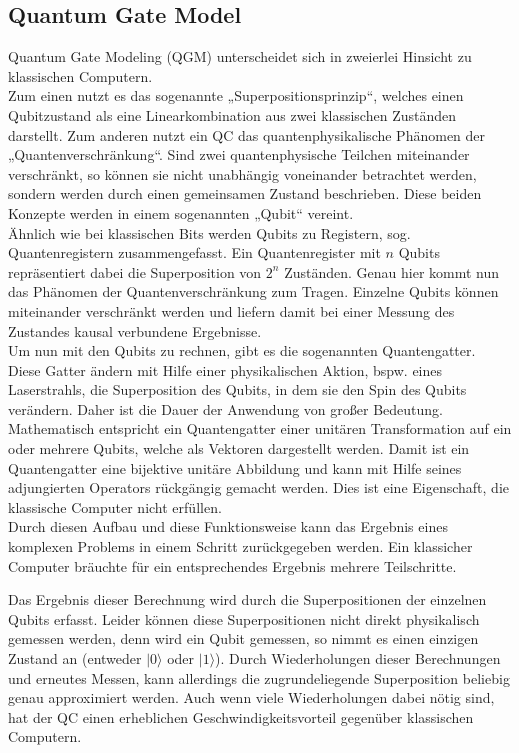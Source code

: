 \subsection{Quantum Gate Model}
\label{subsec:gmodel}
Quantum Gate Modeling (QGM) unterscheidet sich in zweierlei Hinsicht zu klassischen Computern.\\
Zum einen nutzt es das sogenannte „Superpositionsprinzip“, welches einen Qubitzustand als eine Linearkombination aus zwei klassischen Zuständen darstellt. Zum anderen nutzt ein QC das quantenphysikalische Phänomen der „Quantenverschränkung“. Sind zwei quantenphysische Teilchen miteinander verschränkt, so können sie nicht unabhängig voneinander betrachtet werden, sondern werden durch einen gemeinsamen Zustand beschrieben. Diese beiden Konzepte werden in einem sogenannten „Qubit“ vereint.\\ 
Ähnlich wie bei klassischen Bits werden Qubits zu Registern, sog. Quantenregistern zusammengefasst. Ein Quantenregister mit $n$ Qubits repräsentiert dabei die Superposition von $2^{n}$ Zuständen. Genau hier kommt nun das Phänomen der Quantenverschränkung zum Tragen. Einzelne Qubits können miteinander verschränkt werden und liefern damit bei einer Messung des Zustandes kausal verbundene Ergebnisse.\\
Um nun mit den Qubits zu rechnen, gibt es die sogenannten Quantengatter. Diese Gatter ändern mit Hilfe einer physikalischen Aktion, bspw. eines Laserstrahls, die Superposition des Qubits, in dem sie den Spin des Qubits verändern. Daher ist die Dauer der Anwendung von großer Bedeutung. Mathematisch entspricht ein Quantengatter einer unitären Transformation auf ein oder mehrere Qubits, welche als Vektoren dargestellt werden. Damit ist ein Quantengatter eine bijektive unitäre Abbildung und kann mit Hilfe seines adjungierten Operators rückgängig gemacht werden. Dies ist eine Eigenschaft, die klassische Computer nicht erfüllen.\\

Durch diesen Aufbau und diese Funktionsweise kann das Ergebnis eines komplexen Problems in einem Schritt zurückgegeben werden. Ein klassicher Computer bräuchte für ein entsprechendes Ergebnis mehrere Teilschritte.

Das Ergebnis dieser Berechnung wird durch die Superpositionen der einzelnen Qubits erfasst.
Leider können diese Superpositionen nicht direkt physikalisch gemessen werden, denn wird ein Qubit gemessen, so nimmt es einen einzigen Zustand an (entweder $|0\rangle$ oder $|1\rangle$). Durch Wiederholungen dieser Berechnungen und erneutes Messen, kann allerdings die zugrundeliegende Superposition beliebig genau approximiert werden. Auch wenn viele Wiederholungen dabei nötig sind, hat der QC einen erheblichen Geschwindigkeitsvorteil gegenüber klassischen Computern.

